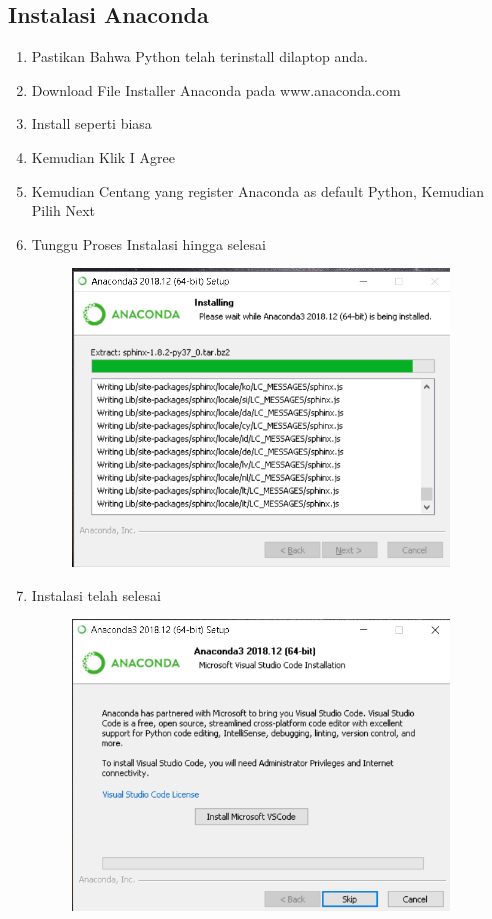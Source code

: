 \subsection{Instalasi Anaconda}
\begin{enumerate}
    \item Pastikan Bahwa Python telah terinstall dilaptop anda.
    \item Download File Installer Anaconda pada www.anaconda.com
    \item Install seperti biasa
    \item Kemudian Klik I Agree
    \item Kemudian Centang yang register Anaconda as default Python, Kemudian Pilih Next
    \item Tunggu Proses Instalasi hingga selesai
    \begin{figure}[H]
		\includegraphics[width=10cm]{figures/fahmi/1.png}
		\centering
	\end{figure}

    \item Instalasi telah selesai
	 \begin{figure}[H]
		\includegraphics[width=10cm]{figures/fahmi/2.png}
		\centering
	\end{figure}
	
\end{enumerate}
	

